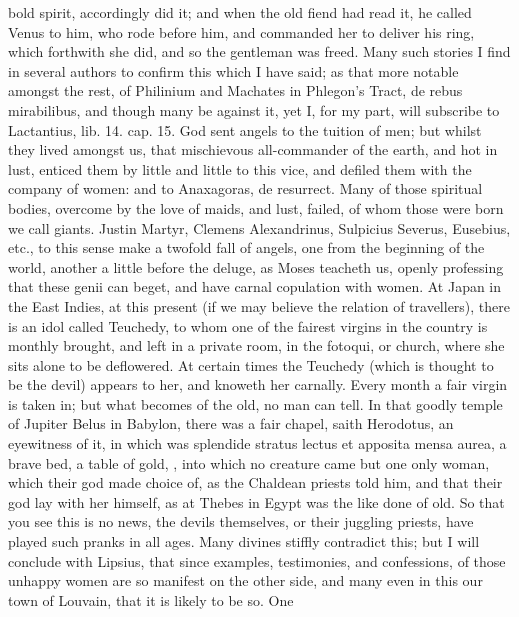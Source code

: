 bold spirit, accordingly did it; and when the old fiend had read it, he
called Venus to him, who rode before him, and commanded her to deliver
his ring, which forthwith she did, and so the gentleman was freed. Many
such stories I find in several authors to confirm this which I
have said; as that more notable amongst the rest, of Philinium and
Machates in Phlegon's Tract, de rebus mirabilibus, and though
many be against it, yet I, for my part, will subscribe to Lactantius,
lib. 14. cap. 15. God sent angels to the tuition of men; but
whilst they lived amongst us, that mischievous all-commander of the
earth, and hot in lust, enticed them by little and little to this vice,
and defiled them with the company of women: and to Anaxagoras, de
resurrect. Many of those spiritual bodies, overcome by the love
of maids, and lust, failed, of whom those were born we call giants.
Justin Martyr, Clemens Alexandrinus, Sulpicius Severus, Eusebius, etc.,
to this sense make a twofold fall of angels, one from the beginning of
the world, another a little before the deluge, as Moses teacheth us,
openly professing that these genii can beget, and have carnal
copulation with women. At Japan in the East Indies, at this present (if
we may believe the relation of travellers), there is an idol
called Teuchedy, to whom one of the fairest virgins in the country is
monthly brought, and left in a private room, in the fotoqui, or church,
where she sits alone to be deflowered. At certain times the
Teuchedy (which is thought to be the devil) appears to her, and knoweth
her carnally. Every month a fair virgin is taken in; but what becomes
of the old, no man can tell. In that goodly temple of Jupiter Belus in
Babylon, there was a fair chapel, saith Herodotus, an eyewitness
of it, in which was splendide stratus lectus et apposita mensa aurea, a
brave bed, a table of gold, \etc{}, into which no creature came but one
only woman, which their god made choice of, as the Chaldean priests
told him, and that their god lay with her himself, as at Thebes in
Egypt was the like done of old. So that you see this is no news, the
devils themselves, or their juggling priests, have played such pranks
in all ages. Many divines stiffly contradict this; but I will conclude
with Lipsius, that since examples, testimonies, and confessions,
of those unhappy women are so manifest on the other side, and many even
in this our town of Louvain, that it is likely to be so. One

